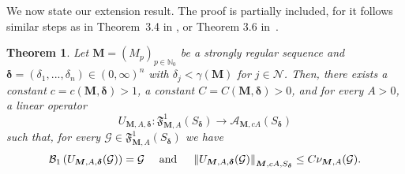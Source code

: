 \documentclass[11pt,a4paper,leqno]{article}
\theoremstyle{plain}
\newtheorem{theo}{Theorem}[section]
\theoremstyle{definition}
\def\N{\mathbb{N}}
\def\bdelta{\boldsymbol{\delta}}
\def\bM{\boldsymbol{M}}
\begin{document}
We now state our extension result. The proof is partially included, for it follows similar steps as in Theorem~3.4 in \cite{javier}, or Theorem 3.6 in~\cite{lastrasanz}.
\begin{theo}
Let $\bM=(M_{p})_{p\in\N_0}$ be a strongly regular sequence and $\bdelta=(\delta_{1},...,\delta_{n})\in(0,\infty)^n$ with $\delta_{j}<\gamma(\bM)$ for $j\in\mathcal{N}$. Then, there exists a constant $c=c(\bM,\bdelta)>1$, a constant $C=C(\bM,\bdelta)>0$, and for every $A>0$, a linear operator
$$U_{\bM,A,\bdelta}:\mathfrak{F}_{\bM,A}^{1}(S_{\bdelta})\longrightarrow \mathcal{A}_{\bM,cA}(S_{\bdelta})$$
such that, for every $\mathcal{G}\in\mathfrak{F}_{\bM,A}^{1}(S_{\bdelta})$ we have
$$\mathcal{B}_{1}\left(U_{\bM,A,\bdelta}(\mathcal{G})\right)=\mathcal{G}\quad\hbox{ and }\quad \left\|U_{\bM,A,\bdelta}(\mathcal{G})\right\|_{\bM,cA,S_{\bdelta}}  \le C\nu_{\bM,A}(\mathcal{G}).$$
\end{theo}
\end{document}
